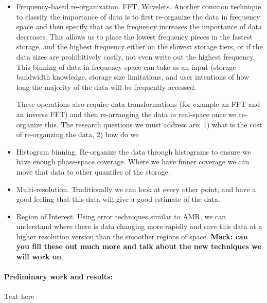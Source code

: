 \begin{itemize}
\item Frequency-based re-organization. FFT, Wavelets.
Another common technique to classify the importance of data is to first re-organize the data
in frequency space and then specify that as the frequency increases the importance of data
decreases. This allows us to place the lowest frequency pieces in the fastest storage, and
the highest frequency either on the slowest storage tiers, or if the data sizes are prohibitively  
costly, not even write out the highest frequency. This binning of data in frequency space can
take as an input (storage bandwidth knowledge, storage size limitations, and user intentions
of how long the majority of the data will be frequently accessed. 

These operations also require data transformations (for example an FFT and an inverse FFT)
and then re-arranging the data in real-space once we re-organize this. The research questions
we must address are: 1) what is the cost of re-organzing the data, 2) how do we 

\item Histogram binning. Re-organize the data through histograms to ensure we have enough
phase-space coverage. Where we have finner coverage we can move that data to other
quantiles of the storage. 

\item Multi-resolution. Traditionally we can look at every other point, and have a good feeling that 
this data will give a good estimate of the data.

\item Region of Interest. Using error techniques similar to AMR, we can understand where there
is data changing more rapidly and save this data at a higher resolution version than the smoother
regions of space.
{\bf Mark: can you fill these out much more and talk about the new techniques we will work on}.
\end{itemize}
\paragraph{Preliminary work and results:}
Text here
